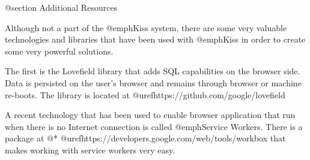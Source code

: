 @section Additional Resources

Although not a part of the @emph{Kiss} system, there are some very
valuable technologies and libraries that have been used with
@emph{Kiss} in order to create some very powerful solutions.

The first is the Lovefield library that adds SQL capabilities on the
browser side.  Data is persisted on the user's browser and remains
through browser or machine re-boots.  The library is located at
@uref{https://github.com/google/lovefield}

A recent technology that has been used to enable browser application
that run when there is no Internet connection is called @emph{Service
Workers}.  There is a package at @*
@uref{https://developers.google.com/web/tools/workbox} that makes
working with service workers very easy.



